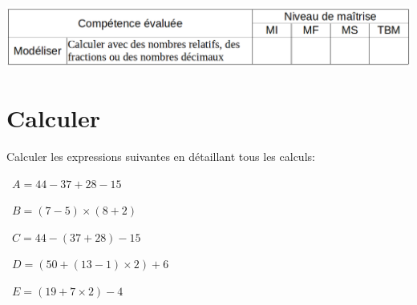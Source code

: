	\includegraphics[scale=0.4]{competences}

\section{Calculer}
Calculer les expressions suivantes en détaillant tous les calculs:
\begin{questions}
	
	
	\question[2]  $A = 44 - 37 + 28 - 15$
	
	\fillwithdottedlines{6cm}
	
	
	
	\question[2]  $B = (7 - 5) \times (8 + 2)$
	
	\fillwithdottedlines{6cm}
	
	\newpage
	\question[2]  $C = 44 - (37 + 28) - 15$
	
	\fillwithdottedlines{6cm}
	
	
	\question[2]  $D = (50 + (13 - 1) \times 2) + 6$
	
	\fillwithdottedlines{6cm}
	
	
	\question[2]  $E = (19 + 7 \times 2) - 4$
	
	\fillwithdottedlines{6cm}
\end{questions}



